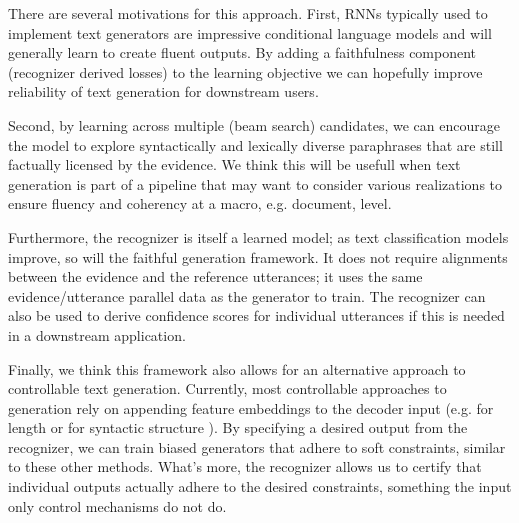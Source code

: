 There are several motivations for this approach. 
First, RNNs typically used to implement text generators are impressive
conditional language models and will generally learn to create fluent outputs.
By adding a faithfulness component (recognizer derived 
losses) to the learning objective we can hopefully improve reliability 
of text generation for downstream users. 

Second, by learning across
multiple (beam search) candidates, we can encourage the model to 
explore syntactically and lexically diverse paraphrases that are still
factually licensed by the evidence. We think this will be usefull when
text generation is part of a pipeline that may want to consider various 
realizations to ensure fluency and coherency at a macro, e.g. document, level.

Furthermore, the recognizer is itself a learned model; 
as text classification models improve, so will the faithful generation 
framework.
It does not require
alignments between the evidence and the reference utterances; it uses
the same evidence/utterance parallel data as the generator to train.
The recognizer can also be used to derive confidence scores 
for individual utterances if this is needed
in a downstream application. 


Finally, we think this framework also allows for an alternative approach
to controllable text generation. Currently, most controllable approaches
to generation rely on appending feature embeddings to the decoder 
input (e.g. for length \citep{fan2017controllable} or for syntactic 
structure \citep{colin2018generating}). By specifying a desired output from
the recognizer, we can train biased generators that adhere to soft constraints,
similar to these other methods.
What's more, the recognizer allows us to certify that individual outputs 
actually adhere to the desired constraints, something the input only control
mechanisms do not do.










